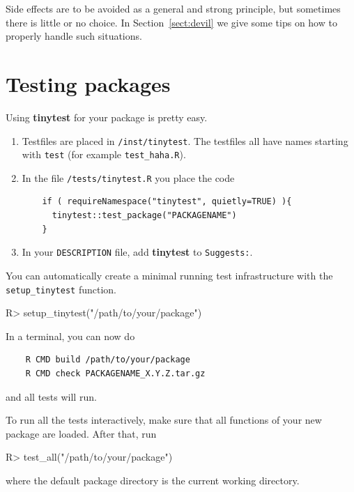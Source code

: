 \documentclass[11pt]{article}
\newcommand{\code}[1]{\texttt{#1}}
\newcommand{\pkg}[1]{\textbf{#1}}
\let\oldmarginpar\marginpar
\renewcommand{\marginpar}[1]{\oldmarginpar{\color{bluetext}\raggedleft\scriptsize #1}}
\begin{document}
Side effects are to be avoided as a general and strong principle, but sometimes
there is little or no choice. In Section~\ref{sect:devil} we give some tips on
how to properly handle such situations.






\section{Testing packages}

Using \pkg{tinytest} for your package is pretty easy.
\begin{enumerate}
\item Testfiles are placed in \code{/inst/tinytest}. The testfiles all have
names starting with \code{test} (for example \code{test\_haha.R}).
\item In the file \code{/tests/tinytest.R} you place the code
\begin{verbatim}
    if ( requireNamespace("tinytest", quietly=TRUE) ){
      tinytest::test_package("PACKAGENAME")
    }
\end{verbatim}
\item In your \code{DESCRIPTION} file, add \pkg{tinytest} to \code{Suggests:}.
\end{enumerate}
You can automatically create a minimal running test infrastructure
with the \code{setup\_tinytest} function. \marginpar{\code{setup\_tinytest}}
\begin{Schunk}
\begin{Sinput}
R>  setup_tinytest("/path/to/your/package")
\end{Sinput}
\end{Schunk}

In a terminal, you can now do
\begin{verbatim}
    R CMD build /path/to/your/package
    R CMD check PACKAGENAME_X.Y.Z.tar.gz
\end{verbatim}
and all tests will run. 


To run all the tests interactively, make sure that all functions of your 
new package are loaded. After that, run\marginpar{\code{test\_all}}
\begin{Schunk}
\begin{Sinput}
R>  test_all("/path/to/your/package")
\end{Sinput}
\end{Schunk}
where the default package directory is the current working directory.
\end{document}
